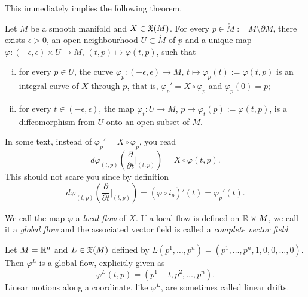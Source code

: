 This immediately implies the following theorem.

\begin{theorem} %
  \label{thm:exuniqloc}
  Let $M$ be a smooth manifold and $X\in\mathfrak{X}(M)$. For every $p\in \mathring M := M\setminus \partial M$, there exists $\epsilon > 0$, an open neighbourhood $U\subset\mathring M$ of $p$ and a unique map $\varphi : (-\epsilon, \epsilon) \times U \to M$, $(t, p) \mapsto \varphi(t,p)$, such that
  \begin{enumerate}[(i)]
    \item for every $p\in U$, the curve $\varphi_p : (-\epsilon, \epsilon) \to M$, $t\mapsto \varphi_p(t) := \varphi(t, p)$ is an integral curve of $X$ through $p$, that is, $\varphi_p' = X\circ\varphi_p$ and $\varphi_p(0) = p$;
    \item for every $t\in(-\epsilon, \epsilon)$, the map $\varphi_t: U \to M$, $p\mapsto \varphi_t(p):=\varphi(t,p)$, is a diffeomorphism from $U$ onto an open subset of $M$.
  \end{enumerate}
\end{theorem}
  
\begin{remark}
  In some text, instead of $\varphi_p' = X\circ\varphi_p$, you read
  \begin{equation}
    d\varphi_{(t,p)}\left(\frac{\partial}{\partial t}\Big|_{(t,p)}\right) = X \circ \varphi(t,p).
  \end{equation}
  This should not scare you since by definition
  \begin{equation}
    d\varphi_{(t,p)}\left(\frac{\partial}{\partial t}\Big|_{(t,p)}\right) = (\varphi \circ i_p)'(t) = \varphi_p'(t).
  \end{equation}
\end{remark}

We call the map $\varphi$ a \emph{local flow} of $X$.
If a local flow is defined on $\mathbb{R}\times M$, we call it a \emph{global flow} and the associated vector field is called a \emph{complete vector field}.

\begin{example}\label{example:lineardrift}
  Let $M=\mathbb{R}^n$ and $L\in\mathfrak{X}(M)$ defined by $L(p^1, \ldots, p^n) = (p^1, \ldots, p^n, 1, 0, 0, \ldots, 0)$.
  Then $\varphi^L$ is a global flow, explicitly given as
  \begin{equation}
    \varphi^L(t,p) = (p^1+t, p^2, \ldots, p^n).
  \end{equation}
  Linear motions along a coordinate, like $\varphi^L$, are sometimes called linear drifts.
\end{example}

